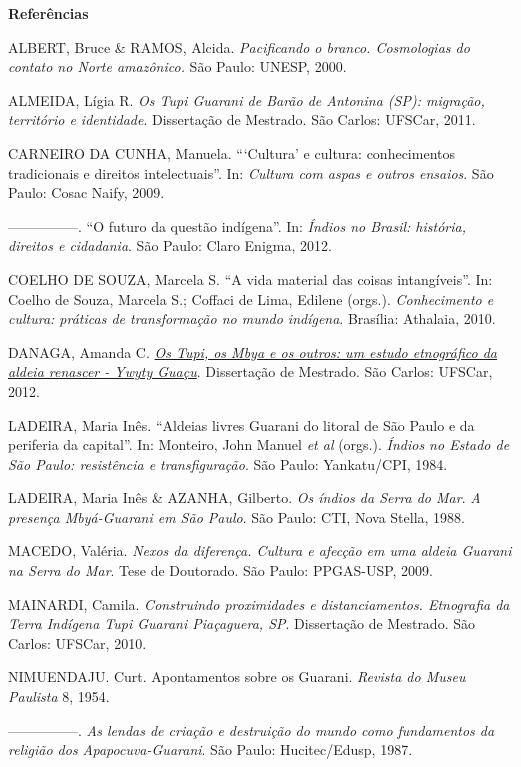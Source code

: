 \textbf{Referências}

ALBERT, Bruce \& RAMOS, Alcida. \emph{Pacificando o branco. Cosmologias
do contato no Norte amazônico.} São Paulo: UNESP, 2000.

ALMEIDA, Lígia R. \emph{Os Tupi Guarani de Barão de Antonina (SP):
migração, território e identidade}. Dissertação de Mestrado. São Carlos:
UFSCar, 2011.

CARNEIRO DA CUNHA, Manuela. ```Cultura' e cultura: conhecimentos
tradicionais e direitos intelectuais''. In: \emph{Cultura com aspas e
outros ensaios}. São Paulo: Cosac Naify, 2009.

---------------. ``O futuro da questão indígena''. In: \emph{Índios no
Brasil: história, direitos e cidadania}. São Paulo: Claro Enigma, 2012.

COELHO DE SOUZA, Marcela S. ``A vida material das coisas intangíveis''.
In: Coelho de Souza, Marcela S.; Coffaci de Lima, Edilene (orgs.).
\emph{Conhecimento e cultura: práticas de transformação no mundo
indígena}. Brasília: Athalaia, 2010.

DANAGA, Amanda C.
\href{http://200.136.241.56/htdocs/tedeSimplificado/tde_busca/arquivo.php?codArquivo=4848}{\emph{Os
Tupi, os Mbya e os outros: um estudo etnográfico da aldeia renascer -
Ywyty Guaçu}}. Dissertação de Mestrado. São Carlos: UFSCar, 2012.

LADEIRA, Maria Inês. ``Aldeias livres Guarani do litoral de São Paulo e
da periferia da capital''. In: Monteiro, John Manuel \emph{et al}
(orgs.). \emph{Índios no Estado de São Paulo: resistência e
transfiguração}. São Paulo: Yankatu/CPI, 1984.

LADEIRA, Maria Inês \& AZANHA, Gilberto. \emph{Os índios da Serra do
Mar}. \emph{A presença Mbyá-Guarani em São Paulo}. São Paulo: CTI, Nova
Stella, 1988.

MACEDO, Valéria. \emph{Nexos da diferença. Cultura e afecção em uma
aldeia Guarani na Serra do Mar}. Tese de Doutorado. São Paulo:
PPGAS-USP, 2009.

MAINARDI, Camila. \emph{Construindo proximidades e distanciamentos.
Etnografia da Terra Indígena Tupi Guarani Piaçaguera, SP}. Dissertação
de Mestrado. São Carlos: UFSCar, 2010.

NIMUENDAJU. Curt. Apontamentos sobre os Guarani. \emph{Revista do Museu
Paulista} 8, 1954.

---------------. \emph{As lendas de criação e destruição do mundo como
fundamentos da religião dos Apapocuva-Guarani}. São Paulo:
Hucitec/Edusp, 1987.

